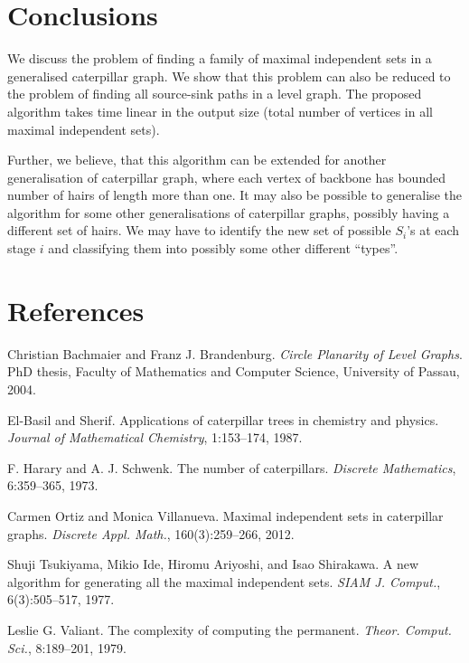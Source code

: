 \documentclass[10pt]{article}
\begin{document}
\section*{Conclusions}

We discuss the problem of finding a family of maximal independent sets in
a generalised caterpillar graph. We show that this problem can also be
reduced to the problem of finding all source-sink paths in a level graph.
The proposed algorithm takes time linear in the output size (total number
of vertices in all maximal independent sets).

Further, we believe, that this algorithm can be extended for another
generalisation of caterpillar graph, where each vertex of backbone has
bounded number of hairs of length more than one. It may also be possible
to generalise the algorithm for some other generalisations of caterpillar
graphs, possibly having a different set of hairs.  We may have to
identify the new set of possible $S_i$'s at each stage $i$ and
classifying them into possibly some other different ``types''. 

\section*{References}


\noindent [1] Christian Bachmaier and Franz J. Brandenburg. {\em Circle Planarity
of Level Graphs}. PhD thesis, Faculty of Mathematics and Computer
Science, University of Passau, 2004.

\noindent [2] El-Basil and Sherif. Applications of caterpillar trees in chemistry
and physics. {\em Journal of Mathematical Chemistry}, 1:153--174, 1987.

\noindent [3] F. Harary and A. J. Schwenk. The number of caterpillars.  {\em
Discrete Mathematics}, 6:359--365, 1973.

\noindent [4] Carmen Ortiz and Monica Villanueva. Maximal independent sets in
caterpillar graphs. {\em Discrete Appl. Math.}, 160(3):259--266, 2012.

\noindent [5] Shuji Tsukiyama, Mikio Ide, Hiromu Ariyoshi, and Isao Shirakawa. A
new algorithm for generating all the maximal independent sets. {\em SIAM
J. Comput.}, 6(3):505--517, 1977.

\noindent [6] Leslie G. Valiant. The complexity of computing the permanent. {\em
Theor. Comput. Sci.}, 8:189--201, 1979.
\end{document}
